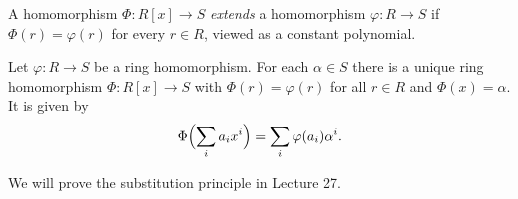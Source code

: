 \documentclass[reqno,11pt]{amsart}
\begin{document}
A homomorphism $\Phi:R[x]\to S$ \emph{extends} a homomorphism
$\varphi:R\to S$ if $\Phi(r)=\varphi(r)$ for every $r\in R$,
viewed as a constant polynomial.

\begin{proposition}\label{prop:substitution}
Let $\varphi:R\to S$ be a ring homomorphism. For each $\alpha\in S$
there is a unique ring homomorphism $\Phi:R[x]\to S$ with
$\Phi(r)=\varphi(r)$ for all $r\in R$ and $\Phi(x)=\alpha$. It is given by
\[
  \Phi\Bigl(\sum_i a_ix^i\Bigr)=\sum_i\varphi(a_i)\alpha^i.
\]
\end{proposition}

We will prove the substitution principle in Lecture 27.
\end{document}
